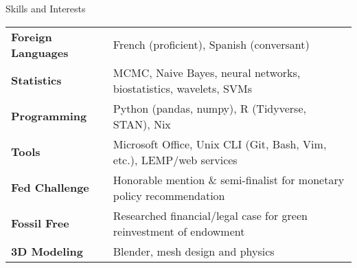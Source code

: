 \begin{rSection}{Skills and Interests}
\begin{tabular}{ @{} >{\bfseries}l @{\hspace{3ex}} l }
  Foreign Languages & French (proficient), Spanish (conversant) \\
  Statistics & MCMC, Naive Bayes, neural networks, biostatistics, wavelets, SVMs \\
  Programming & Python (pandas, numpy), R (Tidyverse, STAN), Nix \\
  Tools & Microsoft Office, Unix CLI (Git, Bash, Vim, etc.), LEMP/web services \\
  Fed Challenge & Honorable mention \& semi-finalist for monetary policy recommendation \\
  Fossil Free & Researched financial/legal case for green reinvestment of endowment \\
  3D Modeling & Blender, mesh design and physics
\end{tabular}
\end{rSection}
